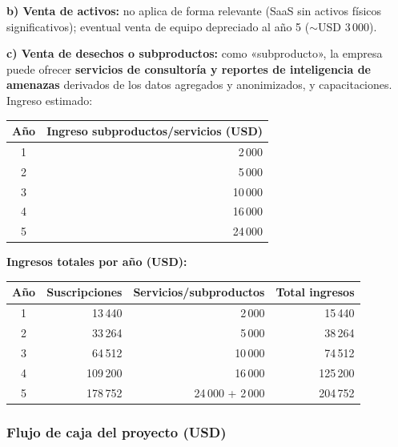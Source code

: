 \noindent\textbf{b) Venta de activos:} no aplica de forma relevante (SaaS sin activos
físicos significativos); eventual venta de equipo depreciado al año 5
($\sim$USD 3\,000).

\noindent\textbf{c) Venta de desechos o subproductos:} como «subproducto», la empresa
puede ofrecer \textbf{servicios de consultoría y reportes de inteligencia de amenazas}
derivados de los datos agregados y anonimizados, y capacitaciones. Ingreso estimado:

\begin{table}[ht]
  \centering
  \begin{tabular}{c r}
    \toprule
    \textbf{Año} & \textbf{Ingreso subproductos/servicios (USD)} \\
    \midrule
    1 & 2\,000  \\
    2 & 5\,000  \\
    3 & 10\,000 \\
    4 & 16\,000 \\
    5 & 24\,000 \\
    \bottomrule
  \end{tabular}
\end{table}

\noindent\textbf{Ingresos totales por año (USD):}

\begin{table}[ht]
  \centering
  \begin{tabular}{c r r r}
    \toprule
    \textbf{Año} & \textbf{Suscripciones} & \textbf{Servicios/subproductos} & \textbf{Total ingresos} \\
    \midrule
    1 & 13\,440  & 2\,000           & 15\,440  \\
    2 & 33\,264  & 5\,000           & 38\,264  \\
    3 & 64\,512  & 10\,000          & 74\,512  \\
    4 & 109\,200 & 16\,000          & 125\,200 \\
    5 & 178\,752 & 24\,000 + 2\,000 & 204\,752 \\
    \bottomrule
  \end{tabular}
\end{table}

\subsubsection*{Flujo de caja del proyecto (USD)}

